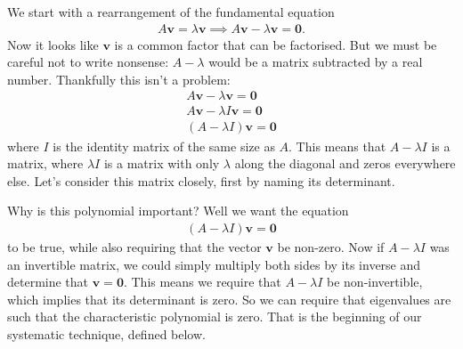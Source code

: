 We start with a rearrangement of the fundamental equation
\begin{align*}
A\mathbf{v} = \lambda\mathbf{v} \implies A\mathbf{v} - \lambda\mathbf{v} = \mathbf{0}.
\end{align*}
Now it looks like $\mathbf{v}$ is a common factor that can be factorised. But we must be careful not to write nonsense: $A-\lambda$ would be a matrix subtracted by a real number. Thankfully this isn't a problem:
\begin{align*}
A\mathbf{v} - \lambda\mathbf{v} = \mathbf{0} \\
A\mathbf{v} - \lambda I\mathbf{v} = \mathbf{0} \\
\left(A - \lambda I\right)\mathbf{v} = \mathbf{0}
\end{align*}
where $I$ is the identity matrix of the same size as $A$. This means that $A - \lambda I$ is a matrix, where $\lambda I$ is a matrix with only $\lambda$ along the diagonal and zeros everywhere else. Let's consider this matrix closely, first by naming its determinant.


\noindent Why is this polynomial important? Well we want the equation
\begin{align*}
\left(A - \lambda I\right)\mathbf{v} = \mathbf{0}
\end{align*}
to be true, while also requiring that the vector $\mathbf{v}$ be non-zero. Now if $A - \lambda I$ was an invertible matrix, we could simply multiply both sides by its inverse and determine that $\mathbf{v}=\mathbf{0}$. This means we require that $A - \lambda I$ be non-invertible, which implies that its determinant is zero. So we can require that eigenvalues are such that the characteristic polynomial is zero. That is the beginning of our systematic technique, defined below.


